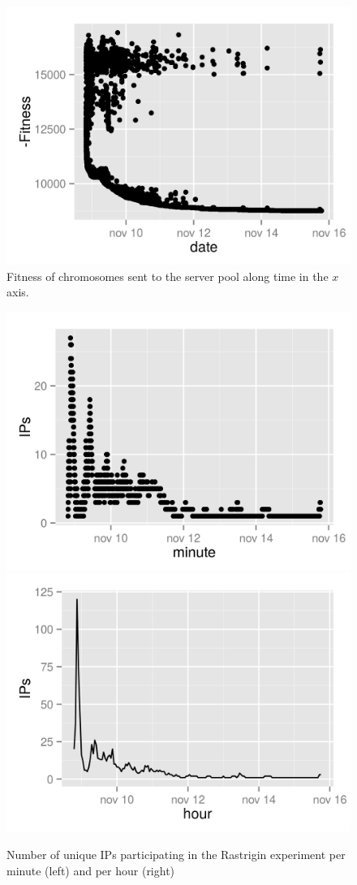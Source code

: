 \documentclass[journal,onecolumn]{IEEEtran}
\begin{document}
%
\begin{figure}[!htb]
\centering
\includegraphics{rastrigin-fitness.png}
\caption{Fitness of chromosomes sent to the server pool along time in
  the $x$ axis.} 
\label{fig:puts:rastrigin}
\end{figure}
%
\begin{figure}[!htb]
\centering
\includegraphics[width=0.49\linewidth]{rastrigin-IPs.png}
\includegraphics[width=0.49\linewidth]{rastrigin-IPs-hour.png}
\caption{Number of unique IPs participating in the Rastrigin
  experiment per minute (left) and per hour (right)} 
\label{fig:ips:rastrigin}
\end{figure}
\end{document}
